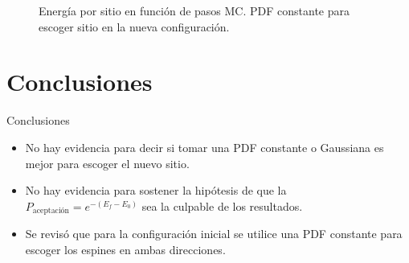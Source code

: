 \documentclass[xcolor=dvipsnames,presentation]{beamer}%
\begin{document}
\begin{frame}
\begin{figure}
\centering
\caption{Energía por sitio en función de pasos MC. PDF constante
 para escoger sitio en la nueva configuración.}
\end{figure}
\end{frame}

{
\AtBeginSection{}
\section{Conclusiones}
\begin{frame}{Conclusiones}
\begin{itemize}
\item No hay evidencia para decir si tomar una PDF constante o Gaussiana 
es mejor para escoger el nuevo sitio.
\item No hay evidencia para sostener la hipótesis de que la \\
$P_{\text{aceptación}}=e^{-(E_f-E_0)}$ sea la culpable de los resultados.
\item Se revisó que para la configuración inicial se utilice una 
PDF constante para escoger los espines en ambas direcciones.
\end{itemize}
\end{frame}
}
\end{document}
